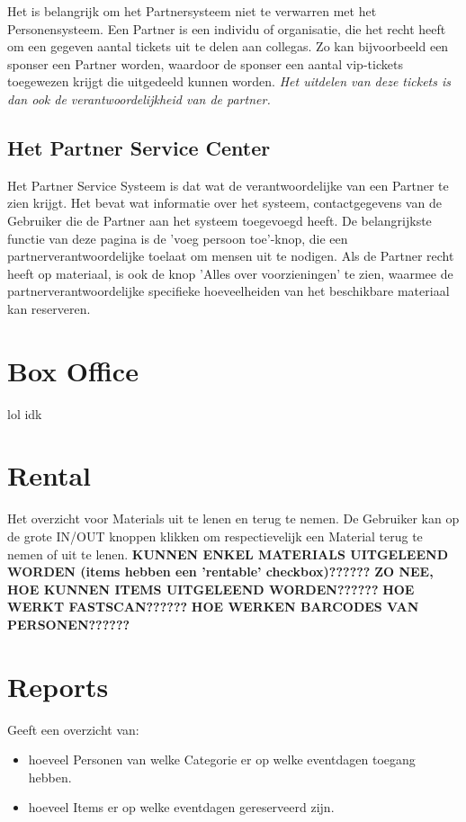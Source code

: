 \documentclass[]{memoir}
\begin{document}
Het is belangrijk om het Partnersysteem niet te verwarren met het Personensysteem. Een Partner is een individu of organisatie, die het recht heeft om een gegeven aantal tickets uit te delen aan collegas. Zo kan bijvoorbeeld een sponser een Partner worden, waardoor de sponser een aantal vip-tickets toegewezen krijgt die uitgedeeld kunnen worden. \textsl{Het uitdelen van deze tickets is dan ook de verantwoordelijkheid van de partner.}

\subsection{Het Partner Service Center}
Het Partner Service Systeem is dat wat de verantwoordelijke van een Partner te zien krijgt. Het bevat wat informatie over het systeem, contactgegevens van de Gebruiker die de Partner aan het systeem toegevoegd heeft.
De belangrijkste functie van deze pagina is de 'voeg persoon toe'-knop, die een partnerverantwoordelijke toelaat om mensen uit te nodigen. Als de Partner recht heeft op materiaal, is ook de knop 'Alles over voorzieningen' te zien, waarmee de partnerverantwoordelijke specifieke hoeveelheiden van het beschikbare materiaal kan reserveren.

\section{Box Office}
lol idk

\section{Rental}
Het overzicht voor Materials uit te lenen en terug te nemen. De Gebruiker kan op de grote IN/OUT knoppen klikken om respectievelijk een Material terug te nemen of uit te lenen.
\textbf{KUNNEN ENKEL MATERIALS UITGELEEND WORDEN (items hebben een 'rentable' checkbox)??????}
\textbf{ZO NEE, HOE KUNNEN ITEMS UITGELEEND WORDEN??????}
\textbf{HOE WERKT FASTSCAN??????}
\textbf{HOE WERKEN BARCODES VAN PERSONEN??????}

\section{Reports}
Geeft een overzicht van:
\begin{itemize}
	\item  hoeveel Personen van welke Categorie er op welke eventdagen toegang hebben.
	\item  hoeveel Items er op welke eventdagen gereserveerd zijn.
\end{itemize}
\end{document}
